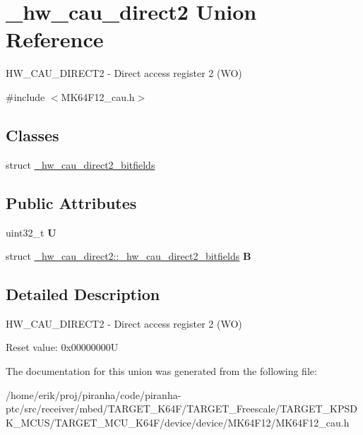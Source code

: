 \hypertarget{union__hw__cau__direct2}{}\section{\+\_\+hw\+\_\+cau\+\_\+direct2 Union Reference}
\label{union__hw__cau__direct2}


H\+W\+\_\+\+C\+A\+U\+\_\+\+D\+I\+R\+E\+C\+T2 -\/ Direct access register 2 (WO)  




{\ttfamily \#include $<$M\+K64\+F12\+\_\+cau.\+h$>$}

\subsection*{Classes}
\begin{DoxyCompactItemize}
\item 
struct \hyperlink{struct__hw__cau__direct2_1_1__hw__cau__direct2__bitfields}{\+\_\+hw\+\_\+cau\+\_\+direct2\+\_\+bitfields}
\end{DoxyCompactItemize}
\subsection*{Public Attributes}
\begin{DoxyCompactItemize}
\item 
uint32\+\_\+t {\bfseries U}\hypertarget{union__hw__cau__direct2_a4f8b18699c9a4a639439d1d78ded4b0c}{}\label{union__hw__cau__direct2_a4f8b18699c9a4a639439d1d78ded4b0c}

\item 
struct \hyperlink{struct__hw__cau__direct2_1_1__hw__cau__direct2__bitfields}{\+\_\+hw\+\_\+cau\+\_\+direct2\+::\+\_\+hw\+\_\+cau\+\_\+direct2\+\_\+bitfields} {\bfseries B}\hypertarget{union__hw__cau__direct2_a6e4b3199566df1c41df87db8b5e194a8}{}\label{union__hw__cau__direct2_a6e4b3199566df1c41df87db8b5e194a8}

\end{DoxyCompactItemize}


\subsection{Detailed Description}
H\+W\+\_\+\+C\+A\+U\+\_\+\+D\+I\+R\+E\+C\+T2 -\/ Direct access register 2 (WO) 

Reset value\+: 0x00000000U 

The documentation for this union was generated from the following file\+:\begin{DoxyCompactItemize}
\item 
/home/erik/proj/piranha/code/piranha-\/ptc/src/receiver/mbed/\+T\+A\+R\+G\+E\+T\+\_\+\+K64\+F/\+T\+A\+R\+G\+E\+T\+\_\+\+Freescale/\+T\+A\+R\+G\+E\+T\+\_\+\+K\+P\+S\+D\+K\+\_\+\+M\+C\+U\+S/\+T\+A\+R\+G\+E\+T\+\_\+\+M\+C\+U\+\_\+\+K64\+F/device/device/\+M\+K64\+F12/M\+K64\+F12\+\_\+cau.\+h\end{DoxyCompactItemize}
